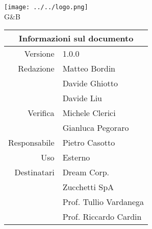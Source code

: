 	\maketitle
	\begin{center}
	\texttt{[image: ../../logo.png]}\newline
	\huge \version 
	\\G\&B
	
	\begin{table}[h!]
		\centering
		\begin{tabular}{r|l}
			\multicolumn{2}{c}{Informazioni sul documento}\\
			\hline
			Versione & 1.0.0 \\
			Redazione & Matteo Bordin\\
			& Davide Ghiotto\\
			& Davide Liu\\
			Verifica & Michele Clerici\\
			& Gianluca Pegoraro\\
			Responsabile & Pietro Casotto\\
			Uso & Esterno\\
			Destinatari & Dream Corp. \\
			& Zucchetti SpA\\
			& Prof. Tullio Vardanega\\
			& Prof. Riccardo Cardin\\
		\end{tabular}
	\end{table}
	
	\end{center}
	\newpage
	
	~\newpage
	\newpage
	\tableofcontents
	\newpage
	\listoftables
	\newpage
	\listoffigures
	\newpage
